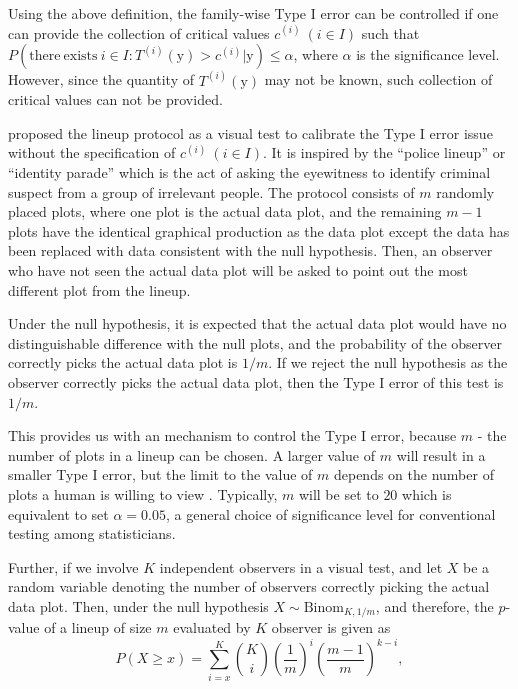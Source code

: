 \documentclass{monashthesis}
\theoremstyle{definition}
\theoremstyle{definition}
\theoremstyle{definition}
\theoremstyle{definition}
\theoremstyle{remark}
\begin{document}
Using the above definition, the family-wise Type I error can be controlled if one can provide the collection of critical values \(c^{(i)}~(i \in I)\) such that \(P(\mathrm{there~exists~} i \in I: T^{(i)}(\boldsymbol{\mathrm{y}}) > c^{(i)}|\boldsymbol{\mathrm{y}}) \leq \alpha\), where \(\alpha\) is the significance level. However, since the quantity of \(T^{(i)}(\boldsymbol{\mathrm{y}})\) may not be known, such collection of critical values can not be provided.

\textcite{buja_statistical_2009} proposed the lineup protocol as a visual test to calibrate the Type I error issue without the specification of \(c^{(i)}~(i \in I)\). It is inspired by the ``police lineup'' or ``identity parade'' which is the act of asking the eyewitness to identify criminal suspect from a group of irrelevant people. The protocol consists of \(m\) randomly placed plots, where one plot is the actual data plot, and the remaining \(m - 1\) plots have the identical graphical production as the data plot except the data has been replaced with data consistent with the null hypothesis. Then, an observer who have not seen the actual data plot will be asked to point out the most different plot from the lineup.

Under the null hypothesis, it is expected that the actual data plot would have no distinguishable difference with the null plots, and the probability of the observer correctly picks the actual data plot is \(1/m\). If we reject the null hypothesis as the observer correctly picks the actual data plot, then the Type I error of this test is \(1/m\).

This provides us with an mechanism to control the Type I error, because \(m\) - the number of plots in a lineup can be chosen. A larger value of \(m\) will result in a smaller Type I error, but the limit to the value of \(m\) depends on the number of plots a human is willing to view \autocite{buja_statistical_2009}. Typically, \(m\) will be set to \(20\) which is equivalent to set \(\alpha = 0.05\), a general choice of significance level for conventional testing among statisticians.

Further, if we involve \(K\) independent observers in a visual test, and let \(X\) be a random variable denoting the number of observers correctly picking the actual data plot. Then, under the null hypothesis \(X \sim \mathrm{Binom}_{K,1/m}\), and therefore, the \(p\)-value of a lineup of size \(m\) evaluated by \(K\) observer is given as
\begin{equation} \label{eq:pvaluesingle}
P(X \geq x) = \sum_{i=x}^{K}{{K}\choose{i}}\left(\frac{1}{m}\right)^i\left(\frac{m-1}{m}\right)^{k-i},
\end{equation}
\end{document}
